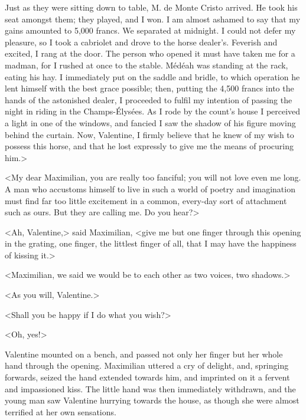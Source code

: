  Just as they were sitting down to table, M. de Monte Cristo arrived. He took his seat amongst them; they played, and I won. I am almost ashamed to say that my gains amounted to 5,000 francs. We separated at midnight. I could not defer my pleasure, so I took a cabriolet and drove to the horse dealer's. Feverish and excited, I rang at the door. The person who opened it must have taken me for a madman, for I rushed at once to the stable. Médéah was standing at the rack, eating his hay. I immediately put on the saddle and bridle, to which operation he lent himself with the best grace possible; then, putting the 4,500 francs into the hands of the astonished dealer, I proceeded to fulfil my intention of passing the night in riding in the Champs-Élysées. As I rode by the count's house I perceived a light in one of the windows, and fancied I saw the shadow of his figure moving behind the curtain. Now, Valentine, I firmly believe that he knew of my wish to possess this horse, and that he lost expressly to give me the means of procuring him.> 

 <My dear Maximilian, you are really too fanciful; you will not love even me long. A man who accustoms himself to live in such a world of poetry and imagination must find far too little excitement in a common, every-day sort of attachment such as ours. But they are calling me. Do you hear?> 

 <Ah, Valentine,> said Maximilian, <give me but one finger through this opening in the grating, one finger, the littlest finger of all, that I may have the happiness of kissing it.> 

 <Maximilian, we said we would be to each other as two voices, two shadows.> 

 <As you will, Valentine.> 

 <Shall you be happy if I do what you wish?> 

 <Oh, yes!> 

 Valentine mounted on a bench, and passed not only her finger but her whole hand through the opening. Maximilian uttered a cry of delight, and, springing forwards, seized the hand extended towards him, and imprinted on it a fervent and impassioned kiss. The little hand was then immediately withdrawn, and the young man saw Valentine hurrying towards the house, as though she were almost terrified at her own sensations. 